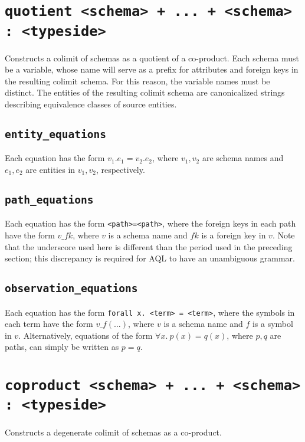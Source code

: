 \documentclass[10pt]{book}
\begin{document}
\section{{\tt quotient <schema> + ... + <schema> : <typeside>}}

Constructs a colimit of schemas as a quotient of a co-product.  Each schema must be a variable, whose name will serve as a prefix for attributes and foreign keys in the resulting colimit schema.  For this reason, the variable names must be distinct.  The entities of the resulting colimit schema are canonicalized strings describing equivalence classes of source entities.

\subsection{{\tt entity\_equations}}

Each equation has the form $v_1.e_1 = v_2.e_2$, where $v_1, v_2$ are schema names and $e_1, e_2$ are entities in $v_1, v_2$, respectively.

\subsection{{\tt path\_equations}}

Each equation has the form {\tt <path>=<path>}, where the foreign keys in each path have the form $v\_fk$, where $v$ is a schema name and $fk$ is a foreign key in $v$.  Note that the underscore used here is different than the period used in the preceding section; this discrepancy is required for AQL to have an unambiguous grammar.

\subsection{{\tt observation\_equations}}

Each equation has the form {\tt forall x. <term> = <term>}, where the symbols in each term have the form $v\_f(\ldots)$, where $v$ is a schema name and $f$ is a symbol in $v$.   Alternatively, equations of the form $\forall x. \ p(x) = q(x)$, where $p,q$ are paths, can simply be written as $p = q$.

\section{{\tt coproduct <schema> + ... + <schema> : <typeside>}}

Constructs a degenerate colimit of schemas as a co-product. 
\end{document}
